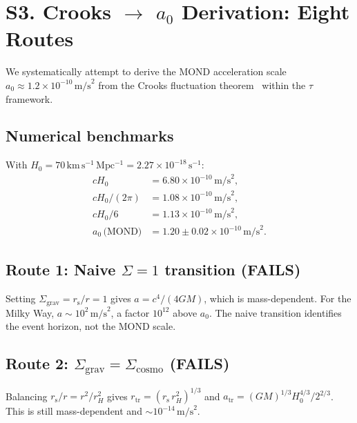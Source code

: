 \documentclass[aps,prd,preprint,superscriptaddress,longbibliography]{revtex4-2}
\newcommand{\tauasym}{\tau}
\newcommand{\rs}{r_{\mathrm{s}}}
\newcommand{\azero}{a_0}
\begin{document}
\section{S3. Crooks $\to$ $\azero$ Derivation: Eight Routes}
\label{sec:crooks_a0}

We systematically attempt to derive the MOND acceleration scale
$\azero \approx 1.2\times 10^{-10}\,\mathrm{m/s}^2$ from the
Crooks fluctuation theorem~\cite{Crooks1999} within the $\tauasym$
framework.

\subsection{Numerical benchmarks}

With $H_0 = 70\,\mathrm{km\,s^{-1}\,Mpc^{-1}}
= 2.27\times 10^{-18}\,\mathrm{s}^{-1}$:
\begin{equation}
\begin{aligned}
cH_0 &= 6.80\times 10^{-10}\,\mathrm{m/s}^2,\\
cH_0/(2\pi) &= 1.08\times 10^{-10}\,\mathrm{m/s}^2,\\
cH_0/6 &= 1.13\times 10^{-10}\,\mathrm{m/s}^2,\\
\azero\,\text{(MOND)} &= 1.20\pm 0.02\times 10^{-10}\,\mathrm{m/s}^2.
\end{aligned}
\label{eq:benchmarks}
\end{equation}

\subsection{Route 1: Naive $\Sigma=1$ transition (FAILS)}

Setting $\Sigma_{\mathrm{grav}} = \rs/r = 1$ gives
$a = c^4/(4GM)$, which is mass-dependent.  For the Milky Way,
$a \sim 10^2\,\mathrm{m/s}^2$, a factor $10^{12}$ above $\azero$.
The naive transition identifies the event horizon, not the MOND
scale.

\subsection{Route 2: $\Sigma_{\mathrm{grav}} = \Sigma_{\mathrm{cosmo}}$
  (FAILS)}

Balancing $\rs/r = r^2/r_H^2$ gives
$r_{\mathrm{tr}} = (\rs\,r_H^2)^{1/3}$ and
$a_{\mathrm{tr}} = (GM)^{1/3}H_0^{4/3}/2^{2/3}$.  This is still
mass-dependent and $\sim 10^{-14}\,\mathrm{m/s}^2$.
\end{document}
